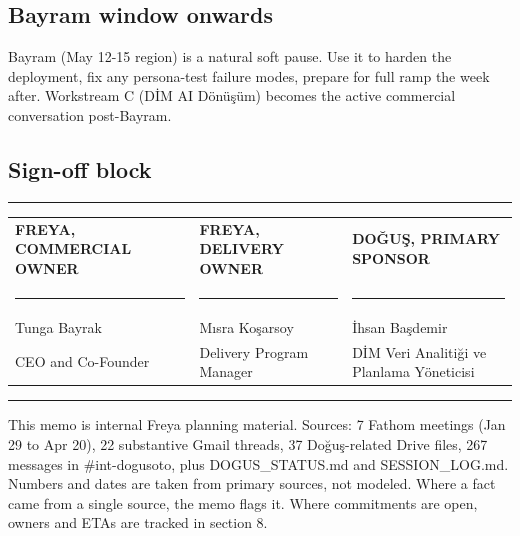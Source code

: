 \documentclass[10pt,a4paper]{article}
\begin{document}
\subsection{Bayram window onwards}

Bayram (May 12-15 region) is a natural soft pause. Use it to harden the deployment, fix any persona-test failure modes, prepare for full ramp the week after. Workstream C (DİM AI Dönüşüm) becomes the active commercial conversation post-Bayram.

\subsection{Sign-off block}

\vspace{0.6em}
\hrule
\vspace{0.6em}

\begin{tabularx}{\linewidth}{@{}XXX@{}}
\textbf{\color{Light}\footnotesize FREYA, COMMERCIAL OWNER} & \textbf{\color{Light}\footnotesize FREYA, DELIVERY OWNER} & \textbf{\color{Light}\footnotesize DOĞUŞ, PRIMARY SPONSOR} \\[0.3em]
\rule{4cm}{0.4pt} & \rule{4cm}{0.4pt} & \rule{4cm}{0.4pt} \\[0.2em]
Tunga Bayrak & Mısra Koşarsoy & İhsan Başdemir \\
CEO and Co-Founder & Delivery Program Manager & DİM Veri Analitiği ve Planlama Yöneticisi \\
\end{tabularx}

\vspace{1.5em}
\hrule
\vspace{0.6em}

{\footnotesize\color{Light}This memo is internal Freya planning material. Sources: 7 Fathom meetings (Jan 29 to Apr 20), 22 substantive Gmail threads, 37 Doğuş-related Drive files, 267 messages in \#int-dogusoto, plus DOGUS\_STATUS.md and SESSION\_LOG.md. Numbers and dates are taken from primary sources, not modeled. Where a fact came from a single source, the memo flags it. Where commitments are open, owners and ETAs are tracked in section 8.}
\end{document}
